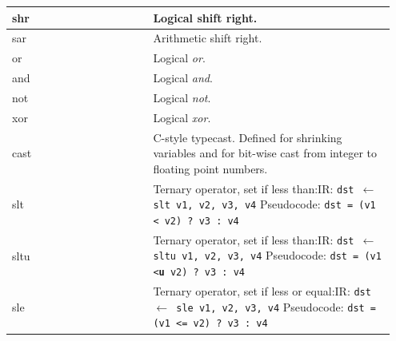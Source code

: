 \documentclass[course=eragp]{aspdoc}
\begin{document}
\begin{center}
\begin{longtable}{p{0.35\linewidth} | p{0.6\linewidth}}
        \hline
        shr          & Logical shift right.                                                                                                       \\
        \hline
        sar          & Arithmetic shift right.                                                                                                    \\
        \hline
        or           & Logical \textit{or}.                                                                                                       \\
        \hline
        and          & Logical \textit{and}.                                                                                                      \\
        \hline
        not          & Logical \textit{not}.                                                                                                      \\
        \hline
        xor          & Logical \textit{xor}.                                                                                                      \\
        \hline
        cast         & C-style typecast. Defined for shrinking variables and for bit-wise cast from integer to
        floating point numbers.                                                                                                                   \\
        \hline
        slt          & Ternary operator, set if less than:\newline IR: \texttt{dst $\leftarrow$ slt v1, v2, v3, v4} \newline
        Pseudocode: \texttt{dst = (v1 < v2) ? v3 : v4}                                                                                            \\
        \hline
        sltu         & Ternary operator, set if less than:\newline IR: \texttt{dst $\leftarrow$ sltu v1, v2, v3, v4} \newline
        Pseudocode: \texttt{dst = (v1 <\textbf{u} v2) ? v3 : v4}                                                                                  \\
        \hline
        sle          & Ternary operator, set if less or equal:\newline IR: \texttt{dst $\leftarrow$ sle v1, v2, v3, v4} \newline
        Pseudocode: \texttt{dst = (v1 <= v2) ? v3 : v4}                                                                                           \\

\end{longtable}
\end{center}
\end{document}
